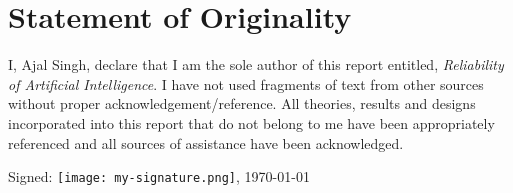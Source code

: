 \chapter*{Statement of Originality}

I, Ajal Singh, declare that I am the sole author of this report entitled,
\textit{Reliability of Artificial Intelligence}. 
I have not used fragments of text from other sources without proper acknowledgement/reference.
All theories, results and designs incorporated into this report that do not belong to me have been 
appropriately referenced and all sources of assistance have been acknowledged.

\bigskip
\bigskip
\bigskip
\bigskip
Signed: \hrulefill\texttt{[image: my-signature.png]}\hrulefill , \today